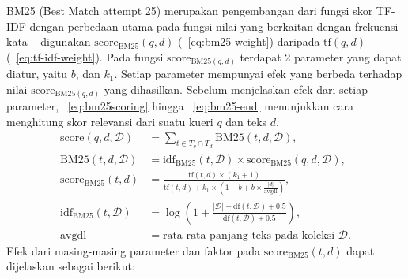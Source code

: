     BM25 (\f{Best Match attempt} 25)  merupakan pengembangan dari fungsi skor TF-IDF dengan perbedaan utama pada fungsi nilai yang berkaitan dengan frekuensi kata -- digunakan $\text{score}_{\text{BM25}}(q,d)$ (\equ~\ref{eq:bm25-weight}) daripada $\text{tf}(q,d)$ (\equ~\ref{eq:tf-idf-weight}). Pada fungsi $\text{score}_{\text{BM25}(q,d)}$ terdapat 2 parameter yang dapat diatur, yaitu $b$, dan $k_1$. Setiap parameter mempunyai efek yang berbeda terhadap nilai $\text{score}_{\text{BM25}(q,d)}$ yang dihasilkan. Sebelum menjelaskan efek dari setiap parameter, \equ~\ref{eq:bm25scoring} hingga \equ~\ref{eq:bm25-end} menunjukkan cara menghitung skor relevansi dari suatu kueri $q$ dan teks $d$. 
    \begin{align}
        \label{eq:bm25scoring}
        \text{score}(q,d,\mathcal{D}) &= \sum_{t \in T_q \cap T_d} \text{BM25}(t, d, \mathcal{D}),\\
        \label{eq:bm25-weight}
        \text{BM25}(t, d, \mathcal{D}) &= \text{idf}_{\text{BM25}}(t, \mathcal{D}) \times \text{score}_{\text{BM25}}(q,d,\mathcal{D}), \\
        \text{score}_{\text{BM25}}(t,d) &= \frac{\text{tf}(t, d) \times (k_1 + 1)}{\text{tf}(t, d) + k_1 \times (1 - b + b \times \frac{|d|}{\text{avgdl}})}, \\
        \label{eq:smoothed-idf}
        \text{idf}_{\text{BM25}}(t, \mathcal{D}) &= \log\left(1+\frac{|\mathcal{D}| - \text{df}(t, \mathcal{D}) + 0.5}{\text{df}(t, \mathcal{D}) + 0.5}\right), \\
        \text{avgdl} &= \text{rata-rata panjang teks pada koleksi } \mathcal{D}.
        \label{eq:bm25-end}
    \end{align}
    Efek dari masing-masing parameter dan faktor pada $\text{score}_{\text{BM25}}(t,d)$ dapat dijelaskan sebagai berikut:
